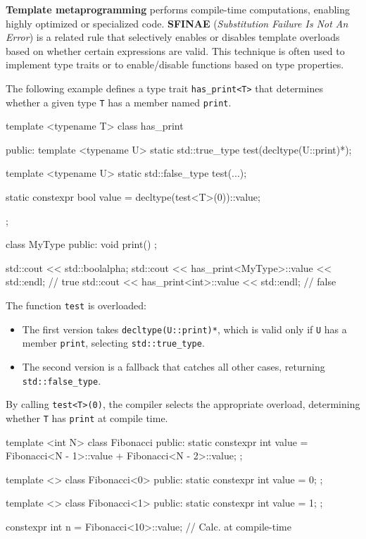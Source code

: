 \textbf{Template metaprogramming} performs compile-time computations, enabling highly optimized or specialized code. \textbf{SFINAE} (\textit{Substitution Failure Is Not An Error}) is a related rule that selectively enables or disables template overloads based on whether certain expressions are valid. This technique is often used to implement type traits or to enable/disable functions based on type properties.

The following example defines a type trait \texttt{has\_print<T>} that determines whether a given type \texttt{T} has a member named \texttt{print}.

\begin{exampleblock}
\begin{codeblock}[language=C++]
template <typename T>
class has_print {
public:
    template <typename U>
    static std::true_type test(decltype(U::print)*);

    template <typename U>
    static std::false_type test(...);

    static constexpr bool value = decltype(test<T>(0))::value;
};

class MyType {
public:
    void print() {}
};

std::cout << std::boolalpha;
std::cout << has_print<MyType>::value << std::endl; // true
std::cout << has_print<int>::value << std::endl;    // false
\end{codeblock}
\end{exampleblock}

    The function \texttt{test} is overloaded:
\begin{itemize}
    \item The first version takes \texttt{decltype(U::print)*}, which is valid only if \texttt{U} has a member \texttt{print}, selecting \texttt{std::true\_type}.
    \item The second version is a fallback that catches all other cases, returning \texttt{std::false\_type}.
\end{itemize}
By calling \texttt{test<T>(0)}, the compiler selects the appropriate overload, determining whether \texttt{T} has \texttt{print} at compile time.

\begin{exampleblock}
\begin{codeblock}[language=C++, numbers=none]
template <int N>
class Fibonacci {
public:
    static constexpr int value = Fibonacci<N - 1>::value + Fibonacci<N - 2>::value;
};

template <>
class Fibonacci<0> {
public:
    static constexpr int value = 0;
};

template <>
class Fibonacci<1> {
public:
    static constexpr int value = 1;
};

constexpr int n = Fibonacci<10>::value; // Calc. at compile-time
\end{codeblock}
\end{exampleblock}

